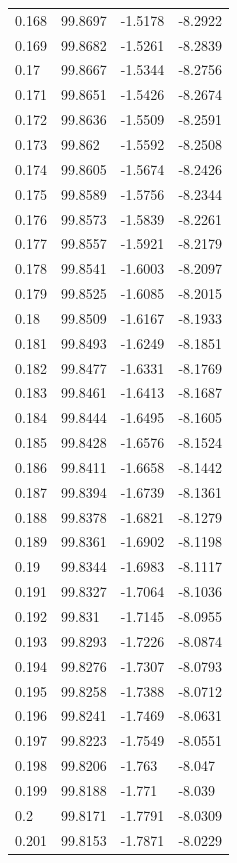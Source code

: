 \begin{tabular}{llll}
0.168 & 99.8697 & -1.5178 & -8.2922 \\
0.169 & 99.8682 & -1.5261 & -8.2839 \\
0.17 & 99.8667 & -1.5344 & -8.2756 \\
0.171 & 99.8651 & -1.5426 & -8.2674 \\
0.172 & 99.8636 & -1.5509 & -8.2591 \\
0.173 & 99.862 & -1.5592 & -8.2508 \\
0.174 & 99.8605 & -1.5674 & -8.2426 \\
0.175 & 99.8589 & -1.5756 & -8.2344 \\
0.176 & 99.8573 & -1.5839 & -8.2261 \\
0.177 & 99.8557 & -1.5921 & -8.2179 \\
0.178 & 99.8541 & -1.6003 & -8.2097 \\
0.179 & 99.8525 & -1.6085 & -8.2015 \\
0.18 & 99.8509 & -1.6167 & -8.1933 \\
0.181 & 99.8493 & -1.6249 & -8.1851 \\
0.182 & 99.8477 & -1.6331 & -8.1769 \\
0.183 & 99.8461 & -1.6413 & -8.1687 \\
0.184 & 99.8444 & -1.6495 & -8.1605 \\
0.185 & 99.8428 & -1.6576 & -8.1524 \\
0.186 & 99.8411 & -1.6658 & -8.1442 \\
0.187 & 99.8394 & -1.6739 & -8.1361 \\
0.188 & 99.8378 & -1.6821 & -8.1279 \\
0.189 & 99.8361 & -1.6902 & -8.1198 \\
0.19 & 99.8344 & -1.6983 & -8.1117 \\
0.191 & 99.8327 & -1.7064 & -8.1036 \\
0.192 & 99.831 & -1.7145 & -8.0955 \\
0.193 & 99.8293 & -1.7226 & -8.0874 \\
0.194 & 99.8276 & -1.7307 & -8.0793 \\
0.195 & 99.8258 & -1.7388 & -8.0712 \\
0.196 & 99.8241 & -1.7469 & -8.0631 \\
0.197 & 99.8223 & -1.7549 & -8.0551 \\
0.198 & 99.8206 & -1.763 & -8.047 \\
0.199 & 99.8188 & -1.771 & -8.039 \\
0.2 & 99.8171 & -1.7791 & -8.0309 \\
0.201 & 99.8153 & -1.7871 & -8.0229 \\

\end{tabular}
